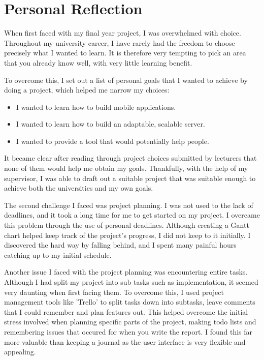 
\chapter{Personal Reflection} %

\label{AppendixA} %


When first faced with my final year project, I was overwhelmed with choice. Throughout my university career, I have rarely had the freedom to choose precisely what I wanted to learn. It is therefore very tempting to pick an area that you already know well, with very little learning benefit.

To overcome this, I set out a list of personal goals that I wanted to achieve by doing a project, which helped me narrow my choices:

\begin{itemize}
	\item I wanted to learn how to build mobile applications.
	\item I wanted to learn how to build an adaptable, scalable server.
	\item I wanted to provide a tool that would potentially help people.
\end{itemize}

It became clear after reading through project choices submitted by lecturers that none of them would help me obtain my goals. Thankfully, with the help of my supervisor, I was able to draft out a suitable project that was suitable enough to achieve both the universities and my own goals.

The second challenge I faced was project planning. I was not used to the lack of deadlines, and it took a long time for me to get started on my project. I overcame this problem through the use of personal deadlines. Although creating a Gantt chart helped keep track of the project's progress, I did not keep to it initially. I discovered the hard way by falling behind, and I spent many painful hours catching up to my initial schedule.

Another issue I faced with the project planning was encountering entire tasks. Although I had split my project into sub tasks such as implementation, it seemed very daunting when first facing them. To overcome this, I used project management tools like 'Trello' to split tasks down into subtasks, leave comments that I could remember and plan features out. This helped overcome the initial stress involved when planning specific parts of the project, making todo lists and remembering issues that occured for when you write the report. I found this far more valuable than keeping a journal as the user interface is very flexible and appealing.

